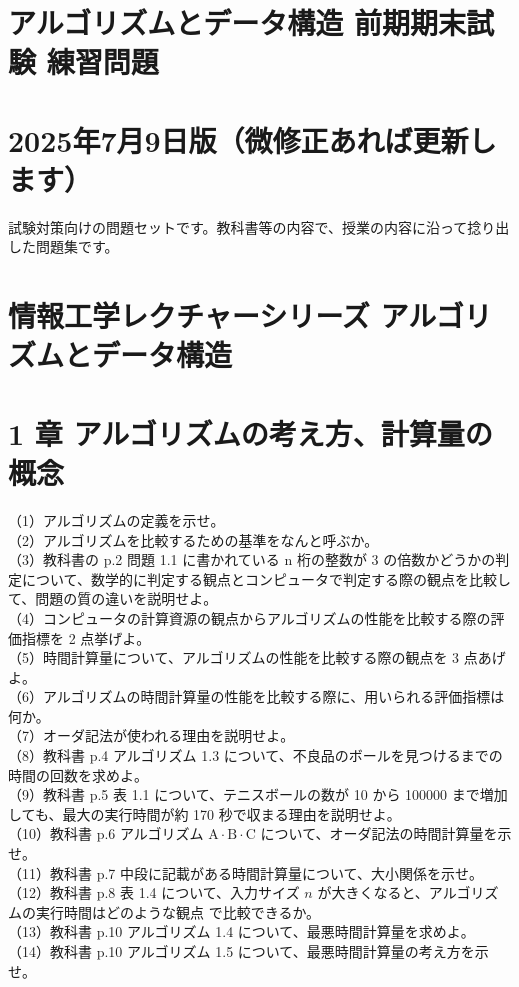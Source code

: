 \documentclass[dvipdfmx]{jreport}
\begin{document}
\section*{\centering アルゴリズムとデータ構造 前期期末試験 練習問題}
\section*{\normalsize\centering2025年7月9日版（微修正あれば更新します）}
試験対策向けの問題セットです。教科書等の内容で、授業の内容に沿って捻り出した問題集です。

\section*{情報工学レクチャーシリーズ アルゴリズムとデータ構造}
\section*{1 章 アルゴリズムの考え方、計算量の概念}
（1）アルゴリズムの定義を示せ。\\
（2）アルゴリズムを比較するための基準をなんと呼ぶか。\\
（3）教科書の p.2 問題 1.1 に書かれている n 桁の整数が 3 の倍数かどうかの判定について、数学的に判定する観点とコンピュータで判定する際の観点を比較して、問題の質の違いを説明せよ。\\
（4）コンピュータの計算資源の観点からアルゴリズムの性能を比較する際の評価指標を 2 点挙げよ。\\
（5）時間計算量について、アルゴリズムの性能を比較する際の観点を 3 点あげよ。\\
（6）アルゴリズムの時間計算量の性能を比較する際に、用いられる評価指標は何か。\\
（7）オーダ記法が使われる理由を説明せよ。\\
（8）教科書 p.4 アルゴリズム 1.3 について、不良品のボールを見つけるまでの時間の回数を求めよ。\\
（9）教科書 p.5 表 1.1 について、テニスボールの数が 10 から 100000 まで増加しても、最大の実行時間が約 170 秒で収まる理由を説明せよ。\\
（10）教科書 p.6 アルゴリズム $\mathrm{A} \cdot \mathrm{B} \cdot \mathrm{C}$ について、オーダ記法の時間計算量を示せ。\\
（11）教科書 p.7 中段に記載がある時間計算量について、大小関係を示せ。\\
（12）教科書 p.8 表 1.4 について、入力サイズ $n$ が大きくなると、アルゴリズムの実行時間はどのような観点 で比較できるか。\\
（13）教科書 p.10 アルゴリズム 1.4 について、最悪時間計算量を求めよ。\\
（14）教科書 p.10 アルゴリズム 1.5 について、最悪時間計算量の考え方を示せ。
\end{document}
